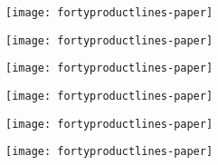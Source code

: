 \documentclass{beamer}
\begin{document}
	\begin{frame}[plain]
		\texttt{[image: fortyproductlines-paper]}
	\end{frame}

	\begin{frame}[plain]
		\texttt{[image: fortyproductlines-paper]}
	\end{frame}

	\begin{frame}[plain]
		\texttt{[image: fortyproductlines-paper]}
	\end{frame}

	\begin{frame}[plain]
		\texttt{[image: fortyproductlines-paper]}
	\end{frame}

	\begin{frame}[plain]
		\texttt{[image: fortyproductlines-paper]}
	\end{frame}

	\begin{frame}[plain]
		\texttt{[image: fortyproductlines-paper]}
	\end{frame}
\end{document}
